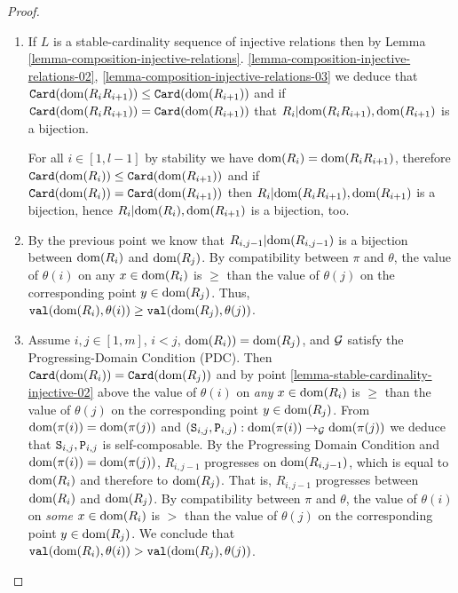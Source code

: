 \documentclass{lmcs}
\begin{document}

\begin{proof}
\begin{enumerate}

\item
If $L$ is a stable-cardinality sequence of injective relations then by Lemma 
\ref{lemma-composition-injective-relations}.
\ref{lemma-composition-injective-relations-02},
\ref{lemma-composition-injective-relations-03} 
we deduce that $\Card(\dom(R_i R_{i+1})) \le \Card(\dom(R_{i+1}))$
and if $\Card(\dom(R_i R_{i+1})) = \Card(\dom(R_{i+1}))$ that
$R_i \restr \dom(R_i R_{i+1}), \dom(R_{i+1})$ is a bijection.
 
For all $i \in [1,l-1]$ by stability we have 
$\dom(R_i) = \dom(R_i R_{i+1})$, therefore 
$\Card(\dom(R_i)) \le \Card(\dom(R_{i+1}))$
and if $\Card(\dom(R_i)) = \Card(\dom(R_{i+1}))$ then 
$R_i \restr \dom(R_i R_{i+1}), \dom(R_{i+1})$ is a bijection,
hence $R_i \restr \dom(R_i ), \dom(R_{i+1})$ is a bijection, too.


\item
By the previous point we know that 
$R_{i,j-1} \restr \dom(R_{i,j-1})$ is a bijection between $\dom(R_i)$
and $\dom(R_j)$. By compatibility between $\pi$ and $\theta$, 
the value of $\theta(i)$ on any $x \in \dom(R_i)$ is $\ge$ than the value of
$\theta(j)$ on the corresponding point $y \in \dom(R_j)$.
Thus, $\val(\dom(R_i),\theta(i)) \ge \val(\dom(R_j),\theta(j))$.

\item
Assume $i,j \in[1,m]$, $i < j$, $\dom(R_i)) =\dom(R_j)$, 
and $\setG$ 
satisfy the Progressing-Domain Condition (PDC).  
Then  $\Card(\dom(R_i)) =\Card(\dom(R_j))$
and by point \ref{lemma-stable-cardinality-injective-02} above
the value of $\theta(i)$ on \emph{any} $x \in \dom(R_i)$ is 
$\ge$ than the value of
$\theta(j)$ on the corresponding point $y \in \dom(R_j)$.
From $\dom(\pi(i)) = \dom(\pi(j))$ and $\composable {\setG} {\dom(\pi(i))} {\dom(\pi(j))} {(\Stat_{i,j},\Prog_{i,j})}$ we deduce that $\Stat_{i,j},\Prog_{i,j}$ is self-composable.
By the Progressing Domain Condition and $\dom(\pi(i)) = \dom(\pi(j))$, 
$R_{i,j-1}$ progresses on
$\dom(R_{i,j-1})$, which is equal to $\dom(R_i)$ and therefore to $\dom(R_j)$.
That is, $R_{i,j-1}$ progresses between $\dom(R_i)$ 
and $\dom(R_j)$. 
By compatibility between $\pi$ and $\theta$, 
the value of $\theta(i)$ on \emph{some} $x \in \dom(R_i)$ is 
$>$ than the value of
$\theta(j)$ on the corresponding point $y \in \dom(R_j)$.
We conclude that $\val(\dom(R_i),\theta(i)) > \val(\dom(R_j),\theta(j))$.


\end{enumerate}
\end{proof}
\end{document}
